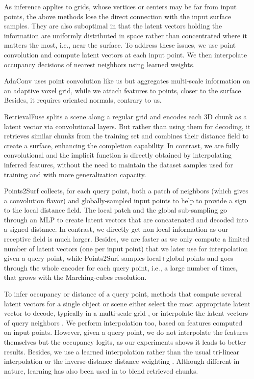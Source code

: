 \documentclass[10pt,twocolumn,letterpaper]{article}
\begin{document}
As inference applies to grids, whose vertices or centers may be far from input points, the above methods lose the direct connection with the input surface samples. They are also suboptimal in that the latent vectors holding the information are uniformly distributed in space rather than concentrated where it matters the most, i.e., near the surface.
To address these issues, we use point convolution and compute latent vectors at each input point. We then interpolate occupancy decisions of nearest neighbors using learned weights.

AdaConv \cite{Ummenhofer2021Adaptive} uses point convolution like us but aggregates multi-scale information on an adaptive voxel grid, while we attach features to points, closer to the surface. Besides, it requires oriented normals, contrary to us.

RetrievalFuse \cite{Siddiqui2021RetrievalFuse} splits a scene along a regular grid and encodes each 3D chunk as a latent vector via convolutional layers. But rather than using them for decoding, it retrieves similar chunks from the training set and combines their distance field to create a surface, enhancing the completion capability.
In contrast, we are fully convolutional and the implicit function is directly obtained by interpolating inferred features, without the need to maintain the dataset samples used for training and with more generalization capacity.

Points2Surf \cite{Erler2020Points2Surf} collects, for each query point, both a patch of neighbors (which gives a convolution flavor) and globally-sampled input points to help to provide a sign to the local distance field. The local patch and the global sub-sampling go through an MLP to create latent vectors that are concatenated and decoded into a signed distance.
In contrast, we directly get non-local information as our receptive field is much larger. Besides, we are faster as we only compute a limited number of latent vectors (one per input point) that we later use for interpolation given a query point, while Points2Surf samples local+global points and goes through the whole encoder for each query point, i.e., a large number of times, that grows with the Marching-cubes resolution.

To infer occupancy or distance of a query point, methods that compute several latent vectors for a single object or scene either select the most appropriate latent vector to decode, typically in a multi-scale grid \cite{Ummenhofer2021Adaptive}, or interpolate the latent vectors of query neighbors \cite{Chibane2020CVPR, Jiang2020CVPR, Peng2020ECCV, Chibane2020Neural, Lionar_2021_WACV, tang2021sign}. We perform interpolation too, based on features computed on input points. However, given a query point, we do not interpolate the features themselves but the occupancy logits, as our experiments shows it leads to better results. Besides, we use a learned interpolation rather than the usual tri-linear interpolation \cite{Chibane2020CVPR, Jiang2020CVPR, Peng2020ECCV, Chibane2020Neural, Lionar_2021_WACV, tang2021sign} or the inverse-distance distance weighting \cite{Qi2017NIPS}. Although different in nature, learning has also been used in \cite{Siddiqui2021RetrievalFuse} to blend retrieved chunks.
 
\end{document}
